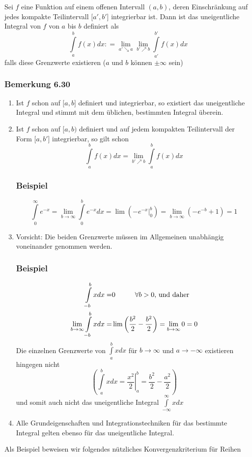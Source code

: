 \begin{definition}{6.29}
Sei $f$ eine Funktion auf einem offenen Intervall $(a,b)$, deren Einschränkung auf jedes kompakte Teilintervall $\lbrack a',b'\rbrack$ integrierbar ist. Dann ist das uneigentliche Integral von $f$ von $a$ bis $b$ definiert als \[\int\limits_a^b {f(x)dx: = \mathop {\lim }\limits_{a' \searrow a} \mathop {\lim }\limits_{b' \nearrow b} } \int\limits_{a'}^{b'} {f(x)dx} \] falls diese Grenzwerte existieren ($a$ und $b$ können $\pm \infty$ sein)
\end{definition}

 \subsubsection*{Bemerkung 6.30}
\begin{enumerate}
\item Ist $f$ schon auf $\lbrack a,b\rbrack$ definiert und integrierbar, so existiert das uneigentliche Integral und stimmt mit dem üblichen, bestimmten Integral überein.
\item Ist $f$ schon auf $\lbrack a,b)$ definiert und auf jedem kompakten Teilintervall der Form $\lbrack a,b'\rbrack$ integrierbar, so gilt schon  \[\int\limits_a^b {f(x)dx = \mathop {\lim }\limits_{b' \nearrow b} } \int\limits_a^b {f(x)dx} \]
\subsubsection*{Beispiel}
\[\int\limits_0^\infty  {{e^{ - x}}}  = \mathop {\lim }\limits_{b \to \infty } \int\limits_{{0}}^b {{e^{ - x}}dx}  = \lim \left( {\left. { - {e^{ - x}}} \right|_{{0}}^b} \right) = \mathop {\lim }\limits_{b \to \infty } \left( { - {e^{ - b}} + 1} \right) = 1\]
\item Vorsicht: Die beiden Grenzwerte müssen im Allgemeinen unabhängig voneinander genommen werden.
\subsubsection*{Beispiel}

\begin{align*}
\int\limits_{ - b}^b xdx =& 0 \text{\hspace{10mm}}\forall b>0\text{, und daher}\\
\mathop {\lim }\limits_{b \to \infty } \int\limits_{ - b}^b xdx =&\lim \left( {\frac{{{b^2}}}{2} - \frac{{{b^2}}}{2}} \right) = \mathop {\lim }\limits_{b \to \infty } 0 = 0
\end{align*}
Die einzelnen Grenzwerte von $\int\limits_a^b {xdx} $ für $b\rightarrow \infty$ und $a\rightarrow -\infty$ existieren hingegen nicht \[\left( {\int\limits_a^b {xdx = \left. {\frac{{{x^2}}}{2}} \right|_a^b = \frac{{{b^2}}}{2} - \frac{{{a^2}}}{2}} } \right)\] und somit auch nicht das uneigentliche Integral $\int\limits_{ - \infty }^\infty  {xdx} $

\item Alle Grundeigenschaften und Integrationstechniken für das bestimmte Integral gelten ebenso für das uneigentliche Integral.
\end{enumerate}
Als Beispiel beweisen wir folgendes nützliches Konvergenzkriterium für Reihen
